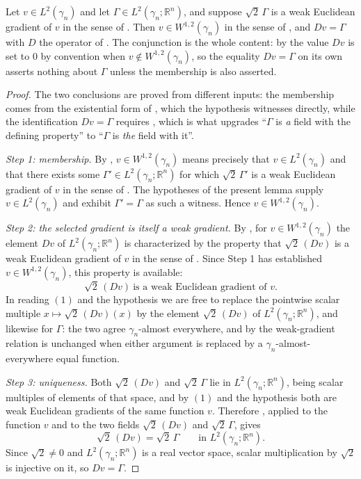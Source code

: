 \begin{lemma}
Let $v \in L^2(\gamma_n)$ and let $\Gamma \in L^2(\gamma_n;\mathbb{R}^n)$, and
suppose $\sqrt2\,\Gamma$ is a weak Euclidean gradient of $v$ in the sense of
.  Then $v \in W^{1,2}(\gamma_n)$ in the sense of
, and $Dv = \Gamma$ with $D$ the operator of .
The conjunction is the whole content: by  the value $Dv$ is set to
$0$ by convention when $v \notin W^{1,2}(\gamma_n)$, so the equality $Dv = \Gamma$
on its own asserts nothing about $\Gamma$ unless the membership is also asserted.
\end{lemma}
\begin{proof}
The two conclusions are proved from different inputs: the membership comes from the
existential form of , which the hypothesis witnesses directly,
while the identification $Dv = \Gamma$ requires , which
is what upgrades ``$\Gamma$ is \emph{a} field with the defining property'' to
``$\Gamma$ is \emph{the} field with it''.

\emph{Step 1: membership.}
By , $v \in W^{1,2}(\gamma_n)$ means precisely that
$v \in L^2(\gamma_n)$ and that there exists some
$\Gamma' \in L^2(\gamma_n;\mathbb{R}^n)$ for which $\sqrt2\,\Gamma'$ is a weak
Euclidean gradient of $v$ in the sense of .  The
hypotheses of the present lemma supply $v \in L^2(\gamma_n)$ and exhibit
$\Gamma' = \Gamma$ as such a witness.  Hence $v \in W^{1,2}(\gamma_n)$.

\emph{Step 2: the selected gradient is itself a weak gradient.}
By , for $v \in W^{1,2}(\gamma_n)$ the element $Dv$ of
$L^2(\gamma_n;\mathbb{R}^n)$ is characterized by the property that $\sqrt2\,(Dv)$
is a weak Euclidean gradient of $v$ in the sense of .
Since Step 1 has established $v \in W^{1,2}(\gamma_n)$, this property is available:
\begin{equation*}
  \sqrt2\,(Dv) \ \text{is a weak Euclidean gradient of } v. \tag{1}
\end{equation*}
In reading $(1)$ and the hypothesis we are free to replace the pointwise scalar
multiple $x \mapsto \sqrt2\,(Dv)(x)$ by the element $\sqrt2\,(Dv)$ of
$L^2(\gamma_n;\mathbb{R}^n)$, and likewise for $\Gamma$: the two agree
$\gamma_n$-almost everywhere, and by  the
weak-gradient relation is unchanged when either argument is replaced by a
$\gamma_n$-almost-everywhere equal function.

\emph{Step 3: uniqueness.}
Both $\sqrt2\,(Dv)$ and $\sqrt2\,\Gamma$ lie in $L^2(\gamma_n;\mathbb{R}^n)$,
being scalar multiples of elements of that space, and by $(1)$ and the hypothesis
both are weak Euclidean gradients of the same function $v$.  Therefore
, applied to the function $v$ and to the two fields
$\sqrt2\,(Dv)$ and $\sqrt2\,\Gamma$, gives
\[
  \sqrt2\,(Dv) = \sqrt2\,\Gamma
  \qquad\text{in } L^2(\gamma_n;\mathbb{R}^n).
\]
Since $\sqrt2 \neq 0$ and $L^2(\gamma_n;\mathbb{R}^n)$ is a real vector space,
scalar multiplication by $\sqrt2$ is injective on it, so $Dv = \Gamma$.
\end{proof}
